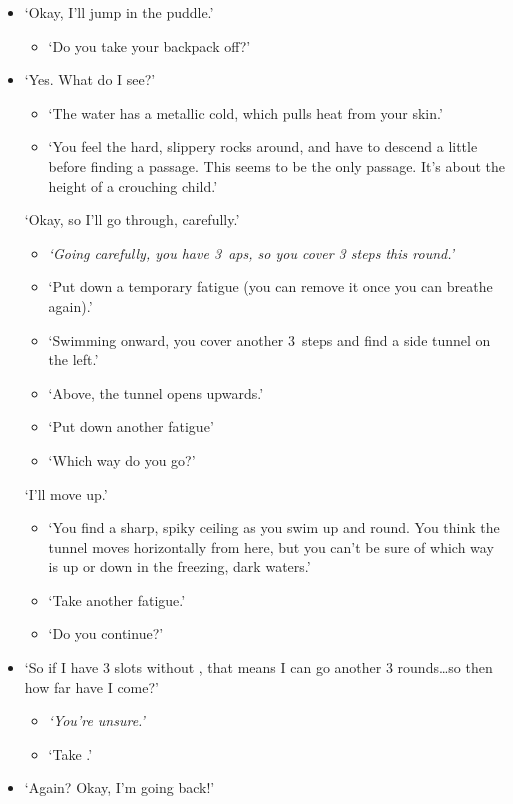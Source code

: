 \begin{multicols}{2}
\begin{itemize}
  \bf
  \item
  `Okay, I'll jump in the puddle.'
  \begin{itemize}
    \it
    \item
    `Do you take your backpack off?'
  \end{itemize}
  \item
  `Yes.
  What do I see?'
  \begin{itemize}
    \it
    \item
    `The water has a metallic cold, which pulls heat from your skin.'
    \item
    `You feel the hard, slippery rocks around, and have to descend a little before finding a passage.
    This seems to be the only passage.
    It's about the height of a crouching child.'
  \end{itemize}
  `Okay, so I'll go through, carefully.'
  \begin{itemize}
    \item
    \it
    `Going carefully, you have 3~\glspl{ap}, so you cover 3 steps this round.'
    \item
    `Put down a temporary \gls{fatigue} (you can remove it once you can breathe again).'
    \item
    `Swimming onward, you cover another 3~\glspl{step} and find a side tunnel on the left.'
    \item
    `Above, the tunnel opens upwards.'
    \item
    `Put down another \gls{fatigue}'
    \item
    `Which way do you go?'
  \end{itemize}
  `I'll move up.'
  \begin{itemize}
    \it
    \item
    `You find a sharp, spiky ceiling as you swim up and round.
    You think the tunnel moves horizontally from here, but you can't be sure of which way is up or down in the freezing, dark waters.'
    \item
    `Take another \gls{fatigue}.'
    \item
    `Do you continue?'
  \end{itemize}
  \item
  `So if I have 3 slots without , that means I can go another 3 rounds\ldots so then how far have I come?'
  \begin{itemize}
    \item
    \it
    `You're unsure.'
    \item
    `Take .'
  \end{itemize}
  \item
  `Again?
  Okay, I'm going back!'
\end{itemize}


\end{multicols}
